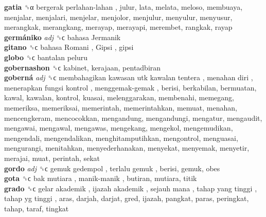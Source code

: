 \textbf{gatia} ␝α   bergerak perlahan-lahan , julur, lata, melata, meloso, membuaya, menjalar, menjalari, menjelar, menjolor, menjulur, menyulur, menyusur, merangkak, merangkang, merayap, merayapi, merembet, rangkak, rayap  \\
\textbf{germániko} \emph{adj}  ␝ϲ   bahasa Jermanik   \\
\textbf{gitano} ␝ϲ   bahasa Romani ,  Gipsi , gipsi  \\
\textbf{globo} ␝ϲ   bantalan peluru   \\
\textbf{gobernashon} ␝ϲ  kabinet, kerajaan, pentadbiran  \\
\textbf{goberná} \emph{adj}  ␝ϲ   membahagikan kawasan utk kawalan tentera ,  menahan diri ,  menerapkan fungsi kontrol ,  menggemak-gemak , berisi, berkabilan, bermuatan, kawal, kawalan, kontrol, kuasai, melenggarakan, membenahi, memegang, memeriksa, memeriksai, memerintah, memerintahkan, memuat, menahan, mencengkeram, mencocokkan, mengandung, mengandungi, mengatur, mengaudit, mengawai, mengawal, mengawas, mengekang, mengekol, mengemudikan, mengendali, mengendalikan, menghitamputihkan, mengontrol, menguasai, mengurangi, menitahkan, menyederhanakan, menyekat, menyemak, menyetir, merajai, muat, perintah, sekat  \\
\textbf{gordo} \emph{adj}  ␝ϲ   gemuk gedempol ,  terlalu gemuk , berisi, gemuk, obes  \\
\textbf{gota} ␝ϲ   bak mutiara ,  manik-manik , butiran, mutiara, titik  \\
\textbf{grado} ␝ϲ   gelar akademik ,  ijazah akademik ,  sejauh mana ,  tahap yang tinggi ,  tahap yg tinggi , aras, darjah, darjat, gred, ijazah, pangkat, paras, peringkat, tahap, taraf, tingkat  \\
